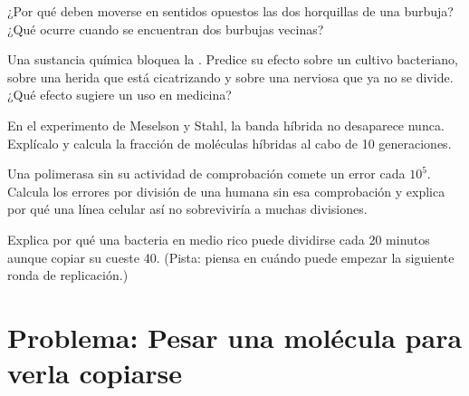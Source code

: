 \begin{exercise}[$\star\star$]\label{exo:g11:dna-replication:11}
¿Por qué deben moverse en sentidos opuestos las dos horquillas de una
burbuja? ¿Qué ocurre cuando se encuentran dos burbujas vecinas?
\end{exercise}

\begin{exercise}[$\star\star\star$]\label{exo:g11:dna-replication:12}
Una sustancia química bloquea la . Predice su efecto
sobre un cultivo bacteriano, sobre una herida que está cicatrizando y
sobre una  nerviosa que ya no se divide. ¿Qué efecto sugiere un
uso en medicina?
\end{exercise}

\begin{exercise}[$\star\star\star$]\label{exo:g11:dna-replication:13}
En el experimento de Meselson y Stahl, la banda híbrida no desaparece
nunca. Explícalo y calcula la fracción de moléculas híbridas al cabo de
10 generaciones.
\end{exercise}

\begin{exercise}[$\star\star\star$]\label{exo:g11:dna-replication:14}
Una polimerasa sin su actividad de comprobación comete un error cada
$10^5$. Calcula los errores por división de una  humana sin esa
comprobación y explica por qué una línea celular así no sobreviviría a
muchas divisiones.
\end{exercise}

\begin{exercise}[$\star\star\star$]\label{exo:g11:dna-replication:15}
Explica por qué una bacteria en medio rico puede dividirse cada 20
minutos aunque copiar su  cueste 40. (Pista: piensa en cuándo
puede empezar la siguiente ronda de replicación.)
\end{exercise}

\section{Problema: Pesar una molécula para verla copiarse}

